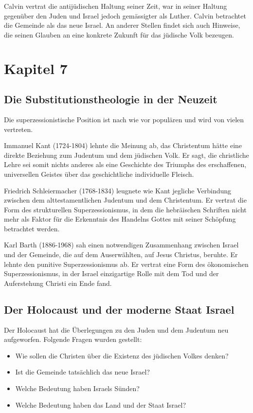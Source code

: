 \documentclass{../../inc/mybib}
\newcommand{\st}{Substitutionstheolog}
\newcommand{\sz}{Superzessionismus}
\begin{document}
    Calvin vertrat die antijüdischen Haltung seiner Zeit, war in seiner Haltung gegenüber den Juden und Israel jedoch gemässigter als Luther. Calvin betrachtet die Gemeinde als das neue Israel. An anderer Stellen findet sich auch Hinweise, die seinen Glauben an eine konkrete Zukunft für das jüdische Volk bezeugen.
    \section{Kapitel 7}
    \subsection{Die \st ie in der Neuzeit}
    Die superzessionistische Position ist nach wie vor populären und wird von vielen vertreten.

    Immanuel Kant (1724-1804) lehnte die Meinung ab, das Christentum hätte eine direkte Beziehung zum Judentum und dem jüdischen Volk. Er sagt, die christliche Lehre sei somit nichts anderes als eine Geschichte des Triumphs des erschaffenen, universellen Geistes über das geschichtliche individuelle Fleisch.

    Friedrich Schleiermacher (1768-1834) leugnete wie Kant jegliche Verbindung zwischen dem alttestamentlichen Judentum und dem Christentum. Er vertrat die Form des strukturellen \sz, in dem die hebräischen Schriften nicht mehr als Faktor für die Erkenntnis des Handelns Gottes mit seiner Schöpfung betrachtet werden.

    Karl Barth (1886-1968) sah einen notwendigen Zusammenhang zwischen Israel und der Gemeinde, die auf dem Auserwählten, auf Jesus Christus, beruhte. Er lehnte den punitive \sz{} ab. Er vertrat eine Form des ökonomischen \sz, in der Israel einzigartige Rolle mit dem Tod und der Auferstehung Christi ein Ende fand.

    \subsection{Der Holocaust und der moderne Staat Israel}
    Der Holocaust hat die Überlegungen zu den Juden und dem Judentum neu aufgeworfen. Folgende Fragen wurden gestellt:
    \begin{itemize}
        \item Wie sollen die Christen über die Existenz des jüdischen Volkes denken?
        \item Ist die Gemeinde tatsächlich das neue Israel?
        \item Welche Bedeutung haben Israels Sünden?
        \item Welche Bedeutung haben das Land und der Staat Israel?
    \end{itemize}
\end{document}
